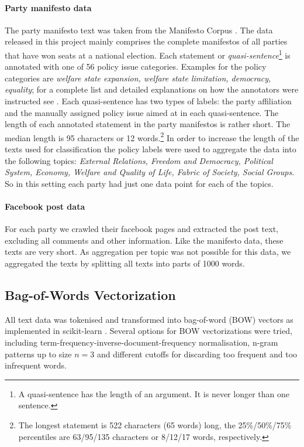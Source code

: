 \documentclass[11pt]{article}
\begin{document}
\paragraph{Party manifesto data}
The party manifesto text was taken from the Manifesto Corpus  \cite{manifesto}. The data released in this project mainly comprises the complete manifestos of all parties that have won seats at a national election. Each statement or {\em quasi-sentence}\footnote{A quasi-sentence has the length of an argument. It is never longer than one sentence.} is annotated with one of 56 policy issue categories. Examples for the policy categories are {\em welfare state expansion, welfare state limitation, democracy, equality}; for a complete list and detailed explanations on how the annotators were instructed see \cite{leftright}. Each quasi-sentence has  two types of labels: the party affiliation and the manually assigned policy issue aimed at in each quasi-sentence. The length of each annotated statement in the party manifestos is rather short. The median length is 95 characters or 12 words.\footnote{The longest statement is 522 characters (65 words) long, the 25\%/50\%/75\% percentiles are 63/95/135 characters or 8/12/17 words, respectively.} 
In order to increase the length of the texts used for classification the policy labels were used to aggregate the data into the following topics: {\em External Relations, Freedom and Democracy, Political System, Economy, Welfare and Quality of Life, Fabric of Society, Social Groups}. So in this setting each party had just one data point for each of the topics. 

\paragraph{Facebook post data}
For each party we crawled their facebook pages \cite{gruene-fb, spd-fb, cducsu-fb, linke-fb} and extracted the post text, excluding all comments and other information. Like the manifesto data, these texts are very short. As aggregation per topic was not possible for this data, we aggregated the texts by splitting all texts into parts of 1000 words. 

\subsection{Bag-of-Words Vectorization}\label{sec:bow-vectorization}
All text data was tokenised and transformed into bag-of-word (BOW) vectors as implemented in scikit-learn \cite{scikit-learn}. Several options for BOW vectorizations were tried, including term-frequency-inverse-document-frequency normalisation, n-gram patterns up to size $n=3$ and different cutoffs for discarding too frequent and too infrequent words.
\end{document}
